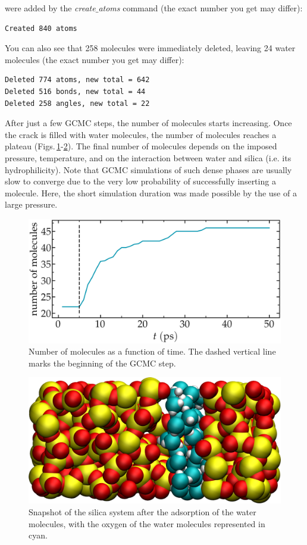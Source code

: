 \documentclass[9pt,tutorial]{livecoms}
\begin{document}
were added by the \textit{create$\_$atoms} command (the exact number you get may differ):
{\normalsize \begin{verbatim}
Created 840 atoms
\end{verbatim}}
You can also see that 258 molecules were immediately deleted, leaving 24 water molecules (the exact number you get may differ):
{\normalsize \begin{verbatim}
Deleted 774 atoms, new total = 642
Deleted 516 bonds, new total = 44
Deleted 258 angles, new total = 22
\end{verbatim}}
After just a few GCMC steps, the number of molecules starts increasing. Once the crack is filled with water molecules, the number of molecules reaches a plateau (Figs.\,\ref{fig:GCMC-number}-\ref{fig:GCMC-solvated}). The final number of molecules depends on the imposed pressure, temperature, and on the interaction between water and silica (i.e. its hydrophilicity). Note that GCMC simulations of such dense phases are usually slow to converge due to the
very low probability of successfully inserting a molecule. Here, the short simulation 
duration was made possible by the use of a large pressure.

\begin{figure}
\centering
\includegraphics[width=\linewidth]{GCMC-number}
\caption{Number of molecules as a function of time. The dashed vertical line marks the beginning of the GCMC step.}
\label{fig:GCMC-number}
\end{figure}

\begin{figure}
\centering
\includegraphics[width=\linewidth]{GCMC-solvated}
\caption{Snapshot of the silica system after the adsorption of the water molecules, with the oxygen of the water molecules represented in cyan.}
\label{fig:GCMC-solvated}
\end{figure}
\end{document}
